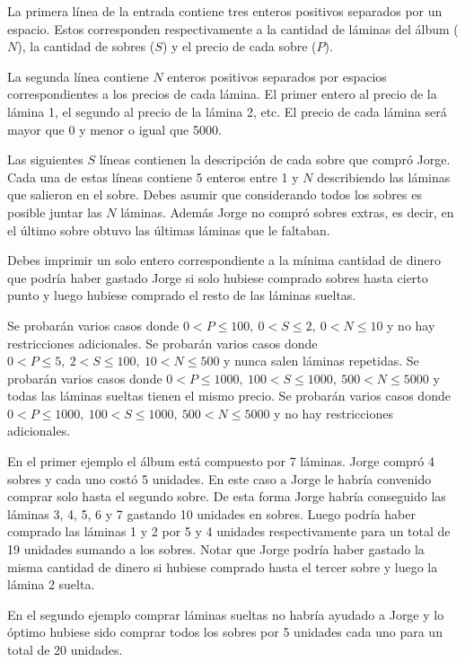 \documentclass{oci}
\begin{document}
\begin{inputDescription}
La primera línea de la entrada contiene tres enteros positivos separados por un espacio.
Estos corresponden respectivamente a la cantidad de láminas del álbum ($N$), la cantidad de sobres ($S$) y el precio de cada sobre ($P$).

La segunda línea contiene $N$ enteros positivos separados por espacios correspondientes a los precios de cada lámina.
El primer entero al precio de la lámina 1, el segundo al precio de la lámina 2, etc.
El precio de cada lámina será mayor que 0 y menor o igual que 5000.

Las siguientes $S$ líneas contienen la descripción de cada sobre que compró Jorge.
Cada una de estas líneas contiene 5 enteros entre 1 y $N$ describiendo las láminas que salieron en el sobre.
Debes asumir que considerando todos los sobres es posible juntar las $N$ láminas. 
Además Jorge no compró sobres extras, es decir, en el último sobre obtuvo las últimas láminas que le faltaban.
\end{inputDescription}

\begin{outputDescription}
Debes imprimir un solo entero correspondiente a la mínima cantidad de dinero que podría haber gastado Jorge si solo hubiese comprado sobres hasta cierto punto y luego hubiese comprado el resto de las láminas sueltas.
\end{outputDescription}

\begin{scoreDescription}
   Se probarán varios casos donde
 $0 < P \leq 100,\ 0 < S \leq 2,\ 0 < N \leq 10$ y no hay restricciones adicionales.
   Se probarán varios casos donde
 $0<P\leq 5,\ 2 < S \leq 100,\ 10 < N \leq 500$ y nunca salen láminas repetidas.
   Se probarán varios casos donde
 $0<P\leq 1000,\ 100 < S \leq 1000,\ 500 < N \leq 5000$ y todas las láminas sueltas tienen el mismo precio.
   Se probarán varios casos donde
 $0<P\leq 1000,\ 100 < S \leq 1000,\ 500<N\leq 5000$ y no hay restricciones adicionales.
\end{scoreDescription}

\begin{sampleDescription}

En el primer ejemplo el álbum está compuesto por 7 láminas.
Jorge compró 4 sobres y cada uno costó 5 unidades.
En este caso a Jorge le habría convenido comprar solo hasta el segundo sobre.
De esta forma Jorge habría conseguido las láminas 3, 4, 5, 6 y 7 gastando 10 unidades en sobres.
Luego podría haber comprado las láminas 1 y 2 por 5 y 4 unidades respectivamente para un total de 19 unidades sumando a los sobres.
Notar que Jorge podría haber gastado la misma cantidad de dinero si hubiese comprado hasta el tercer sobre y luego la lámina 2 suelta.

En el segundo ejemplo comprar láminas sueltas no habría ayudado a Jorge y lo óptimo hubiese sido comprar todos los sobres por 5 unidades cada uno para un total de 20 unidades.

\end{sampleDescription}
\end{document}
